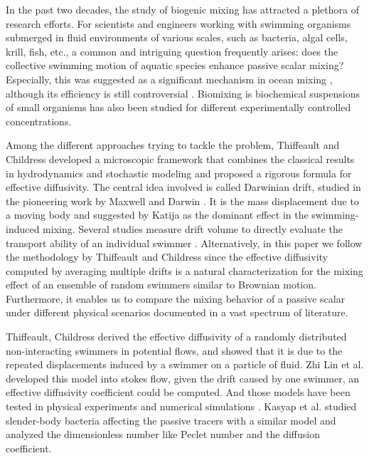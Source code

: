 \documentclass[12pt,a4paper]{article}
\begin{document}
In the past two decades,
the study of biogenic mixing has attracted a plethora of research efforts.
For scientists and engineers working with swimming organisms submerged in fluid environments of various scales, such as bacteria, algal cells, krill, fish, etc.,
a common and intriguing question frequently arises:
does the collective swimming motion of aquatic species enhance passive scalar mixing?
Especially, this was suggested as a significant mechanism in ocean mixing \cite{Role, Observe},
although its efficiency is still controversial \cite{Do, Biomix, Influ, Turbu}.
Biomixing is biochemical suspensions of small organisms has also been studied
\cite{Enhance, Dynamics, Fluid, Self-conce} for different
experimentally controlled concentrations.

Among the different approaches trying to tackle the problem,
Thiffeault and Childress \cite{Stirr} developed a microscopic framework that
combines the classical results in hydrodynamics and stochastic modeling
and proposed a rigorous formula for effective diffusivity.
The central idea involved is called Darwinian drift,
studied in the pioneering work by Maxwell \cite{OnThe} and Darwin \cite{Onthedispacement}.
It is the mass displacement due to a moving body
and suggested by Katija \cite{Aviscosity} as the dominant effect in the swimming-induced mixing.
Several studies measure drift volume to
directly evaluate the transport ability of an individual swimmer \cite{Drift, FluidDispace, Fluidtransport}.
Alternatively,
in this paper
we follow the methodology by Thiffeault and Childress
since the effective diffusivity computed by averaging multiple drifts
is a natural characterization for the mixing effect of an ensemble of
random swimmers similar to Brownian motion.
Furthermore, it enables us to compare the mixing behavior of a passive scalar
under different physical scenarios documented in a vast spectrum of literature.

Thiffeault, Childress \cite{Stirr} derived the effective diffusivity
of a randomly distributed non-interacting swimmers in potential flows,
and showed that it is due to the repeated displacements induced by a
swimmer on a particle of fluid. Zhi Lin et al. \cite{squirments}
developed this model into stokes flow, given the drift caused by one
swimmer, an effective diffusivity coefficient could be computed. And
those models have been tested in physical experiments and numerical
simulations \cite{EnhancedDiffusion, Induced}. Kasyap et
al. \cite{Hydrodynamic} studied slender-body bacteria affecting the
passive tracers with a similar model and analyzed the dimensionless
number like Peclet number and the diffusion coefficient.
\end{document}
